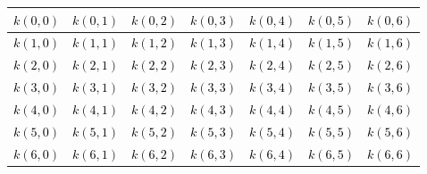 \documentclass[pdflatex,sn-mathphys]{sn-jnl}%
\theoremstyle{thmstyleone}%
\theoremstyle{thmstyletwo}%
\theoremstyle{thmstylethree}%
\begin{document}
\begin{center}
        \begin{tabular}{|p{1cm}|p{1cm}|p{1cm}|p{1cm}|p{1cm}|p{1cm}|p{1cm}|}
        \hline
            \cellcolor{orange!33}\textcolor{black}{$k(0,0)$} & \cellcolor{orange!33}\textcolor{black}{$k(0,1)$} & \cellcolor{yellow!25}\textcolor{black}{$k(0,2)$} & \cellcolor{yellow!25}\textcolor{black}{$k(0,3)$} & \cellcolor{yellow!25}\textcolor{black}{$k(0,4)$} & \cellcolor{black!0}\textcolor{black}{$k(0,5)$} & \cellcolor{black!0}\textcolor{black}{$k(0,6)$} \\
        \hline
            \cellcolor{orange!33}\textcolor{black}{$k(1,0)$} & \cellcolor{orange!33}\textcolor{black}{$k(1,1)$} & \cellcolor{yellow!25}\textcolor{black}{$k(1,2)$} & \cellcolor{yellow!25}\textcolor{black}{$k(1,3)$} & \cellcolor{yellow!25}\textcolor{black}{$k(1,4)$} & \cellcolor{black!0}\textcolor{black}{$k(1,5)$} & \cellcolor{black!0}\textcolor{black}{$k(1,6)$} \\
        \hline
            \cellcolor{yellow!25}\textcolor{black}{$k(2,0)$} & \cellcolor{yellow!25}\textcolor{black}{$k(2,1)$} & \cellcolor{green!25}\textcolor{black}{$k(2,2)$} & \cellcolor{green!25}\textcolor{black}{$k(2,3)$} & \cellcolor{green!25}\textcolor{black}{$k(2,4)$} & \cellcolor{black!0}\textcolor{black}{$k(2,5)$} & \cellcolor{black!0}\textcolor{black}{$k(2,6)$} \\
        \hline
            \cellcolor{yellow!25}\textcolor{black}{$k(3,0)$} & \cellcolor{yellow!25}\textcolor{black}{$k(3,1)$} & \cellcolor{green!25}\textcolor{black}{$k(3,2)$} & \cellcolor{green!25}\textcolor{black}{$k(3,3)$} & \cellcolor{green!25}\textcolor{black}{$k(3,4)$} & \cellcolor{black!0}\textcolor{black}{$k(3,5)$} & \cellcolor{black!0}\textcolor{black}{$k(3,6)$} \\
        \hline
            \cellcolor{yellow!25}\textcolor{black}{$k(4,0)$} & \cellcolor{yellow!25}\textcolor{black}{$k(4,1)$} & \cellcolor{green!25}\textcolor{black}{$k(4,2)$} & \cellcolor{green!25}\textcolor{black}{$k(4,3)$} & \cellcolor{green!25}\textcolor{black}{$k(4,4)$} & \cellcolor{black!0}\textcolor{black}{$k(4,5)$} & \cellcolor{black!0}\textcolor{black}{$k(4,6)$} \\
        \hline
             \cellcolor{black!0}\textcolor{black}{$k(5,0)$} & \cellcolor{black!0}\textcolor{black}{$k(5,1)$} & \cellcolor{black!0}\textcolor{black}{$k(5,2)$} & \cellcolor{black!0}\textcolor{black}{$k(5,3)$} & \cellcolor{black!0}\textcolor{black}{$k(5,4)$} & \cellcolor{black!0}\textcolor{black}{$k(5,5)$} & \cellcolor{black!0}\textcolor{black}{$k(5,6)$} \\
        \hline
            \cellcolor{black!0}\textcolor{black}{$k(6,0)$} & \cellcolor{black!0}\textcolor{black}{$k(6,1)$} & \cellcolor{black!0}\textcolor{black}{$k(6,2)$} & \cellcolor{black!0}\textcolor{black}{$k(6,3)$} & \cellcolor{black!0}\textcolor{black}{$k(6,4)$} & \cellcolor{black!0}\textcolor{black}{$k(6,5)$} & \cellcolor{black!0}\textcolor{black}{$k(6,6)$} \\
        \hline
        \end{tabular}
\end{center}
\end{document}
